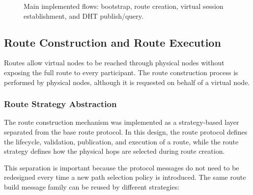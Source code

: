 \documentclass[12pt,a4paper]{article}
\begin{document}
\begin{figure}[H]
{
}
\caption{Main implemented flows: bootstrap, route creation, virtual session establishment, and DHT publish/query.}
\label{fig:implementation-flow}
\end{figure}

\subsection{Route Construction and Route Execution}
\label{sec:route-construction-execution}

Routes allow virtual nodes to be reached through physical nodes without exposing the full route to every participant. The route construction process is performed by physical nodes, although it is requested on behalf of a virtual node.

\subsubsection{Route Strategy Abstraction}
\label{subsec:route-strategy-abstraction}

The route construction mechanism was implemented as a strategy-based layer separated from the base route protocol. In this design, the route protocol defines the lifecycle, validation, publication, and execution of a route, while the route strategy defines how the physical hops are selected during route creation.

This separation is important because the protocol messages do not need to be redesigned every time a new path selection policy is introduced. The same route build message family can be reused by different strategies:
\end{document}
